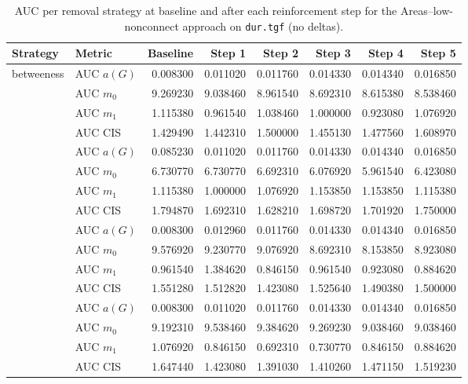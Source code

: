 \begin{table}[htbp]
  \centering
  \caption{AUC per removal strategy at baseline and after each reinforcement step for the Areas–low-nonconnect approach on \texttt{dur.tgf} (no deltas).}
  \label{tab:dur-areas_low_nonconnect-auc}
  \begin{tabular}{llrrrrrr}
    \toprule
    \textbf{Strategy} & \textbf{Metric} & \textbf{Baseline} & \textbf{Step 1} & \textbf{Step 2} & \textbf{Step 3} & \textbf{Step 4} & \textbf{Step 5} \\
    \midrule
    \multirow{4}{*}{betweeness} & AUC $a(G)$ & 0.008300 & 0.011020 & 0.011760 & 0.014330 & 0.014340 & 0.016850 \\
    & AUC $m_0$ & 9.269230 & 9.038460 & 8.961540 & 8.692310 & 8.615380 & 8.538460 \\
    & AUC $m_1$ & 1.115380 & 0.961540 & 1.038460 & 1.000000 & 0.923080 & 1.076920 \\
    & AUC CIS & 1.429490 & 1.442310 & 1.500000 & 1.455130 & 1.477560 & 1.608970 \\
    \addlinespace
    \multirow{4}{*}{closeness} & AUC $a(G)$ & 0.085230 & 0.011020 & 0.011760 & 0.014330 & 0.014340 & 0.016850 \\
    & AUC $m_0$ & 6.730770 & 6.730770 & 6.692310 & 6.076920 & 5.961540 & 6.423080 \\
    & AUC $m_1$ & 1.115380 & 1.000000 & 1.076920 & 1.153850 & 1.153850 & 1.115380 \\
    & AUC CIS & 1.794870 & 1.692310 & 1.628210 & 1.698720 & 1.701920 & 1.750000 \\
    \addlinespace
    \multirow{4}{*}{core influence} & AUC $a(G)$ & 0.008300 & 0.012960 & 0.011760 & 0.014330 & 0.014340 & 0.016850 \\
    & AUC $m_0$ & 9.576920 & 9.230770 & 9.076920 & 8.692310 & 8.153850 & 8.923080 \\
    & AUC $m_1$ & 0.961540 & 1.384620 & 0.846150 & 0.961540 & 0.923080 & 0.884620 \\
    & AUC CIS & 1.551280 & 1.512820 & 1.423080 & 1.525640 & 1.490380 & 1.500000 \\
    \addlinespace
    \multirow{4}{*}{degree} & AUC $a(G)$ & 0.008300 & 0.011020 & 0.011760 & 0.014330 & 0.014340 & 0.016850 \\
    & AUC $m_0$ & 9.192310 & 9.538460 & 9.384620 & 9.269230 & 9.038460 & 9.038460 \\
    & AUC $m_1$ & 1.076920 & 0.846150 & 0.692310 & 0.730770 & 0.846150 & 0.884620 \\
    & AUC CIS & 1.647440 & 1.423080 & 1.391030 & 1.410260 & 1.471150 & 1.519230 \\

\end{tabular}
\end{table}
